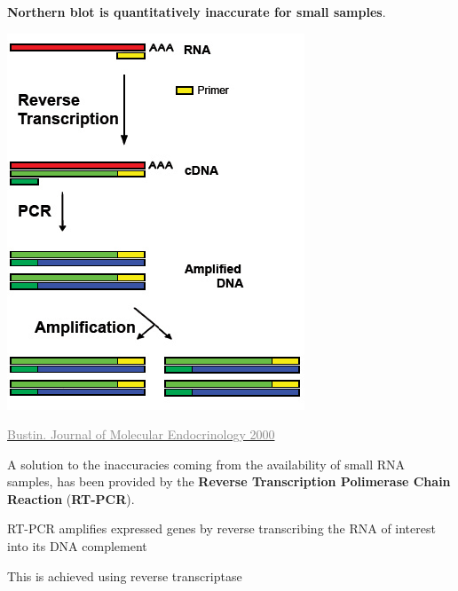 \documentclass[x11names, svgnames]{beamer}
\begin{document}
\begin{frame}
  \frametitle{\three}
  \textbf{Northern blot is quantitatively inaccurate for small samples}.\newline\newline
  \begin{minipage}{0.50\textwidth}
    \includegraphics[scale=0.36]{images/wiki_rt-pcr}
    \begin{center}
      \vspace{-0.5em}
      \href{https://doi.org/10.1677/jme.0.0250169}{\textcolor{gray}{\tiny{Bustin. Journal of Molecular Endocrinology 2000}}}
    \end{center}
  \end{minipage}
  \begin{minipage}{0.45\textwidth}
  A solution to the inaccuracies coming from the availability of small RNA samples, has been provided by the \textbf{Reverse Transcription Polimerase Chain Reaction} (\textbf{RT-PCR}).\newline
    \begin{itemize}
      \small{
        \vspace{-1.0em}
        \item RT-PCR amplifies expressed genes by reverse transcribing the RNA of interest into its DNA complement
        \item This is achieved using reverse transcriptase
      }
    \end{itemize}
  \end{minipage}
\end{frame}
\end{document}
